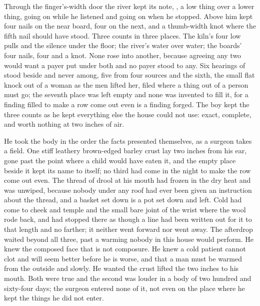 Through the finger's-width door the river kept its note, , a low thing over a lower thing, going on while he listened and going on when he stopped. Above him  kept four nails on the near board, four on the next, and a thumb-width knot where the fifth nail should have stood. Three counts in three places. The kiln's four low pulls and the silence under the floor; the river's water over water; the boards' four nails, four and a knot. None rose into another, because agreeing any two would want a payer put under both and no payer stood to any. Six hearings of  stood beside and never among, five from four sources and the sixth, the small flat knock out of a woman as the men lifted her, filed where a thing out of a person must go; the seventh place was left empty and none was invented to fill it, for a finding filled to make a row come out even is a finding forged. The boy kept the three counts as he kept everything else the house could not use: exact, complete, and worth nothing at two inches of air.

He took the body in the order the facts presented themselves, as a surgeon takes a field. One stiff leathery brown-edged barley crust lay two inches from his ear, gone past the point where a child would have eaten it, and the empty place beside it kept its name to itself; no third had come in the night to make the row come out even. The thread of drool at his mouth had frozen in the dry heat and was unwiped, because nobody under any roof had ever been given an instruction about the thread, and a basket set down is a pot set down and left. Cold had come to cheek and temple and the small bare joint of the wrist where the wool rode back, and had stopped there as though a line had been written out for it to that length and no farther; it neither went forward nor went away. The afterdrop waited beyond all three, past a warming nobody in this house would perform. He knew the composed face that is not composure. He knew a cold patient cannot clot and will seem better before he is worse, and that a man must be warmed from the outside and slowly. He wanted the crust lifted the two inches to his mouth. Both were true and the second was louder in a body of two hundred and sixty-four days; the surgeon entered none of it, not even on the place where he kept the things he did not enter.

\scenebreak

